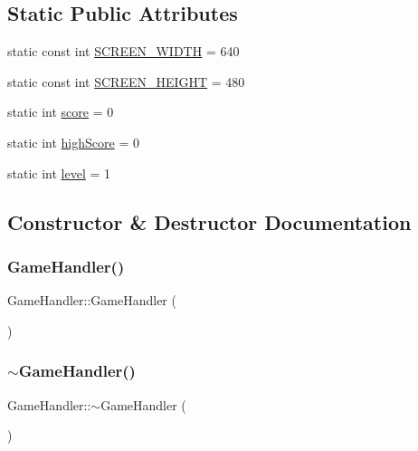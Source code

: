 \subsection*{Static Public Attributes}
\begin{DoxyCompactItemize}
\item 
static const int \mbox{\hyperlink{class_game_handler_a9ae6b1b8478a4bc1928f07d5e52d0b95}{S\+C\+R\+E\+E\+N\+\_\+\+W\+I\+D\+TH}} = 640
\item 
static const int \mbox{\hyperlink{class_game_handler_af09c16007a8cb793fa21dd5fb5d31201}{S\+C\+R\+E\+E\+N\+\_\+\+H\+E\+I\+G\+HT}} = 480
\item 
static int \mbox{\hyperlink{class_game_handler_a985aa228815f283446ce0f354f513e80}{score}} = 0
\item 
static int \mbox{\hyperlink{class_game_handler_a0076f4fe9cad55a986a899bd14b97061}{high\+Score}} = 0
\item 
static int \mbox{\hyperlink{class_game_handler_a534070acd7b75bb0d08f73da3b0afb68}{level}} = 1
\end{DoxyCompactItemize}


\subsection{Constructor \& Destructor Documentation}
\mbox{\label{class_game_handler_ad016ced8da1d660009e014a9aeb833da}} 
\subsubsection{\texorpdfstring{Game\+Handler()}{GameHandler()}}
{\footnotesize\ttfamily Game\+Handler\+::\+Game\+Handler (\begin{DoxyParamCaption}{ }\end{DoxyParamCaption})}

\mbox{\label{class_game_handler_a37e9acdced835f48a2bb2a00cb322635}} 
\subsubsection{\texorpdfstring{$\sim$\+Game\+Handler()}{~GameHandler()}}
{\footnotesize\ttfamily Game\+Handler\+::$\sim$\+Game\+Handler (\begin{DoxyParamCaption}{ }\end{DoxyParamCaption})}



